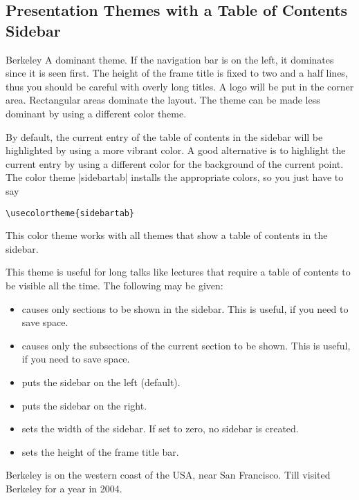 \subsection{Presentation Themes with a Table of Contents Sidebar}

\begin{themeexample}{Berkeley}
  A dominant theme. If the navigation bar is on the left, it dominates since it is seen first. The height of the frame title is fixed to two and a half lines, thus you should be careful with overly long titles. A logo will be put in the corner area. Rectangular areas dominate the layout. The theme can be made less dominant by using a different color theme.

  By default, the current entry of the table of contents in the sidebar will be highlighted by using a more vibrant color. A good alternative is to highlight the current entry by using a different color for the background of the current point. The color theme |sidebartab| installs the appropriate colors, so you just have to say
\begin{verbatim}
\usecolortheme{sidebartab}
\end{verbatim}

  This color theme works with all themes that show a table of contents in the sidebar.

  This theme is useful for long talks like lectures that require a table of contents to be visible all the time. The following  may be given:
  \begin{itemize}
  \item {} causes only sections to be shown in the sidebar. This is useful, if you need to save space.
  \item {} causes only the subsections of the current section to be shown. This is useful, if you need to save space.
  \item {} puts the sidebar on the left (default).
  \item {} puts the sidebar on the right.
  \item {} sets the width of the sidebar. If set to zero, no sidebar is created.
  \item {} sets the height of the frame title bar.
  \end{itemize}

  Berkeley is on the western coast of the USA, near San Francisco. Till visited Berkeley for a year in 2004.
\end{themeexample}

